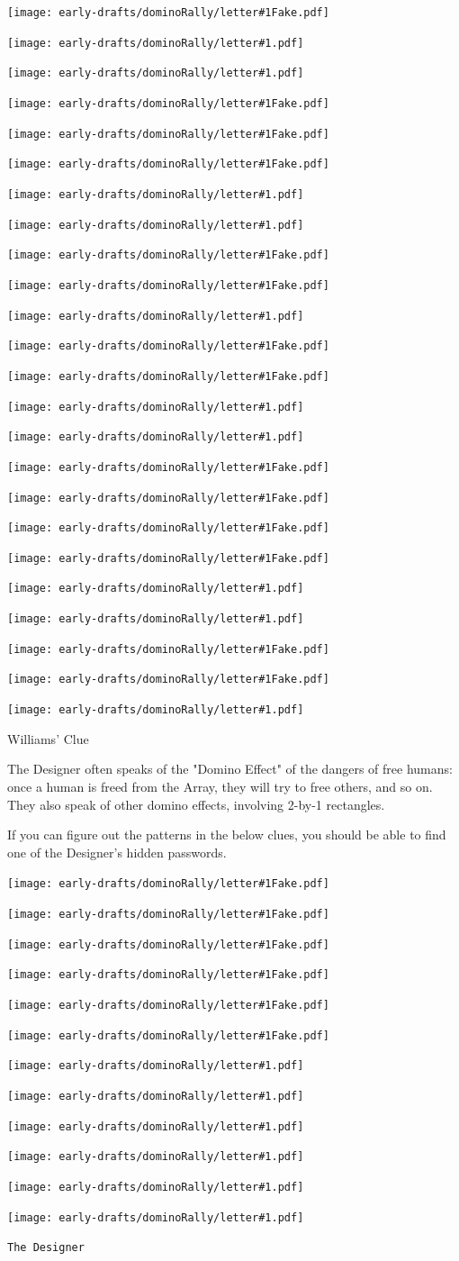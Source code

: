 \documentclass{article}
\newcommand{\dominoLetter}[1]{
\texttt{[image: early-drafts/dominoRally/letter\#1.pdf]}
\hspace{0.03\linewidth}
}
\newcommand{\undominoLetter}[1]{
\texttt{[image: early-drafts/dominoRally/letter\#1Fake.pdf]}
\hspace{0.03\linewidth}
}
\newcommand{\clue}[1]{#1}
\newcommand{\puzzleTitle}[1]{
\begin{center}
{\Large \texttt{#1}}
\end{center}
}
\begin{document}
\begin{center}

\undominoLetter{R}%
\dominoLetter{E}%
\dominoLetter{S}%
\undominoLetter{H}%
\undominoLetter{I}%
\undominoLetter{B}%

\vspace{3em}

\dominoLetter{M}%
\dominoLetter{O}%
\undominoLetter{U}%
\undominoLetter{M}%
\dominoLetter{L}%
\undominoLetter{W}%

\vspace{3em}

\undominoLetter{A}%
\dominoLetter{T}%
\dominoLetter{A}%
\undominoLetter{I}%
\undominoLetter{K}%
\undominoLetter{O}%

\vspace{3em}

\undominoLetter{V}%
\dominoLetter{N}%
\dominoLetter{U}%
\undominoLetter{T}%
\undominoLetter{G}%
\dominoLetter{S}%

\end{center}

\vfill

\newpage

\clue{
Williams' Clue

The Designer often speaks of the "Domino Effect" of the
dangers of free humans: once a human is freed from the
Array, they will
try to free others, and so on. They also speak of other
domino effects, involving 2-by-1 rectangles.

If you can figure out the patterns in the below clues,
you should be able to find one of the Designer's
hidden passwords.

\begin{center}

\undominoLetter{V}%
\undominoLetter{O}%
\undominoLetter{W}%
\undominoLetter{E}%
\undominoLetter{L}%
\undominoLetter{S}%

\vspace{3em}

\dominoLetter{O}%
\dominoLetter{T}%
\dominoLetter{H}%
\dominoLetter{E}%
\dominoLetter{R}%
\dominoLetter{S}%

\end{center}
}

\newpage

\puzzleTitle{The Designer}

\vfill
\end{document}
